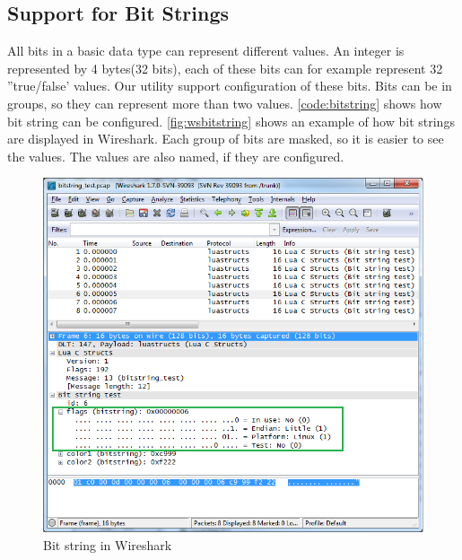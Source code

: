 



\subsection{Support for Bit Strings}
All bits in a basic data type can represent different values. An integer is 
represented by 4 bytes(32 bits), each of these bits can for example represent 
32 ''true/false' values. Our utility support configuration of these bits. Bits 
can be in groups, so they can represent more than two values. 
\autoref{code:bitstring} shows how bit string can be configured. 
\autoref{fig:wsbitstring} shows an example of how bit strings are displayed in 
Wireshark. Each group of bits are masked, so it is easier to see the values. 
The values are also named, if they are configured.

\begin{figure}[ht]
	\center
	\includegraphics[width=\textwidth]{./sprints/img/wireshark_bitstring}
	\caption{Bit string in Wireshark\label{fig:wsbitstring}}
\end{figure}

